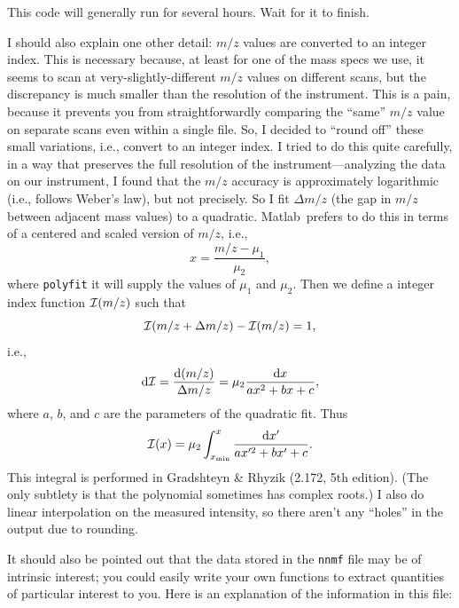\documentclass[notitlepage]{revtex4-1}
\newcommand{\matlab}{{\sc Matlab}}
\newcommand{\ud}{\mathrm{d}}
\begin{document}
This code will generally run for several hours.  Wait for it to finish.

I should also explain one other detail:  $m/z$ values are converted to an integer index.  This is necessary because, at least for one of the mass specs we use, it seems to scan at very-slightly-different $m/z$ values on different scans, but the discrepancy is much smaller than the resolution of the instrument.  This is a pain, because it prevents you from straightforwardly comparing the ``same'' $m/z$ value on separate scans even within a single file.  So, I decided to ``round off'' these small variations, i.e., convert to an integer index.  I tried to do this quite carefully, in a way that preserves the full resolution of the instrument---analyzing the data on our instrument, I found that the $m/z$ accuracy is approximately logarithmic (i.e., follows Weber's law), but not precisely.  So I fit $\Delta m/z$ (the gap in $m/z$ between adjacent mass values) to a quadratic. \matlab\ prefers to do this in terms of a centered and scaled version of $m/z$, i.e.,
\begin{equation}
x = \frac{m/z - \mu_1}{\mu_2},
\end{equation}
where \verb|polyfit| it will supply the values of $\mu_1$ and $\mu_2$.  Then we define a integer index function ${\cal I}(m/z)$ such that
\begin{equation}
{\cal I}(m/z + \Delta m/z) - {\cal I}(m/z) = 1,
\end{equation}
i.e.,
\begin{equation}
\ud {\cal I} = \frac{\ud (m/z)}{\Delta m/z} = \mu_2 \frac{\ud x}{ax^2+bx+c},
\end{equation}
where $a$, $b$, and $c$ are the parameters of the quadratic fit.  Thus
\begin{equation}
{\cal I}(x) = \mu_2 \int_{x_\mathrm{min}}^x \frac{\ud x'}{ax'^2+bx'+c}.
\end{equation}
This integral is performed in Gradshteyn \& Rhyzik (2.172, 5th edition).  (The only subtlety is that the polynomial sometimes has complex roots.)
I also do linear interpolation on the measured intensity, so there aren't any ``holes'' in the output due to rounding.

It should also be pointed out that the data stored in the \verb|nnmf| file may be of intrinsic interest; you could easily write your own functions to extract quantities of particular interest to you.  Here is an explanation of the information in this file:
\end{document}
